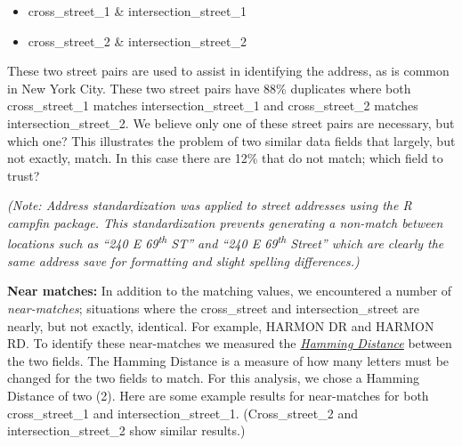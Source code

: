\documentclass[12pt, titlepage]{article}
\begin{document}
\begin{itemize}
	\item cross\_street\_1 \& intersection\_street\_1
	
	\item cross\_street\_2 \& intersection\_street\_2
\end{itemize}

	
These two street pairs are used to assist in identifying the address, 
as is common in New York City. These two street pairs
have 88\% duplicates where both cross\_street\_1 matches 
intersection\_street\_1 and cross\_street\_2 
matches intersection\_street\_2. We believe only one of these
street pairs are necessary, but which one? This illustrates the 
problem of two similar data fields that largely, but not exactly, match. In
this case there are 12\% that do not match; which field to trust?


\textit{(Note: Address standardization was applied to  street 
addresses using the R \textit{campfin} package. This standardization 
prevents generating a non-match between locations such as 
``240 E 69\textsuperscript{th} ST'' and ``240 E 69\textsuperscript{th} Street'' 
which are clearly the same address save for formatting 
and slight spelling differences.)}


\textbf{Near matches:} In addition to the matching values, we 
encountered a number of \textit{near-matches}; situations where the 
cross\_street and intersection\_street are nearly, but not exactly, identical. 
For example, HARMON DR and HARMON RD. To identify these near-matches 
we measured the \href{https://en.wikipedia.org/wiki/Hamming_distance}
\textit{Hamming Distance} between the two fields. The Hamming Distance is a 
measure of how many letters must be changed for the two 
fields to match. For this analysis, we chose a Hamming Distance of two (2).
 Here are some example results for near-matches for both 
 cross\_street\_1 and intersection\_street\_1. 
 (Cross\_street\_2 and intersection\_street\_2 show similar results.)
\end{document}
